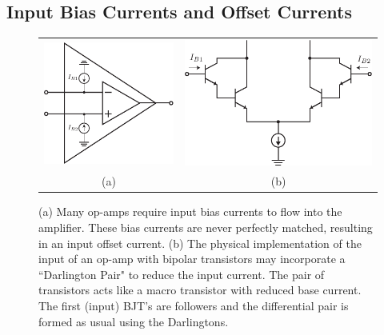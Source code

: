 \subsection{Input Bias Currents and Offset Currents}
\begin{figure}[tb]
\begin{center}
\begin{tabular}{cc}
\includegraphics[scale=1]{opamp_offset_I} &
\includegraphics[scale=1]{bjt_input_darlington} \\
(a) & (b) \\
\end{tabular}
\end{center}
\caption{(a) Many op-amps require input bias currents to flow into the amplifier.  These bias currents are never perfectly matched, resulting in an input offset current. (b) The physical implementation of the input of an op-amp with bipolar transistors may incorporate a ``Darlington Pair" to reduce the input current. The pair of transistors acts like a macro transistor with reduced base current. The first (input) BJT's are followers and the differential pair is formed as usual using the Darlingtons.} \label{fig:opamp_offset_I}
\end{figure}

